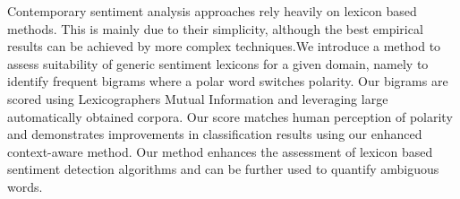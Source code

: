 Contemporary sentiment analysis approaches rely heavily on lexicon based methods. This is mainly due to their simplicity, although the best empirical results can be achieved by more complex techniques.We introduce a method to assess suitability of generic sentiment lexicons for a given domain, namely to identify frequent bigrams where a polar word switches polarity. Our bigrams are scored using Lexicographers Mutual Information and leveraging large automatically obtained corpora. Our score matches human perception of polarity and demonstrates improvements in classification results using our enhanced context-aware method. Our method enhances the assessment of lexicon based sentiment detection algorithms and can be further used to quantify ambiguous words.
